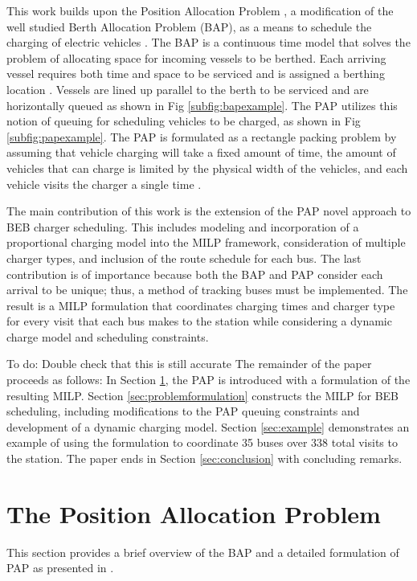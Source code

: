 \documentclass[utf8]{FrontiersinHarvard}
\let\cite\citep                                                                 %
\newcommand{\TODO}[1]{{\color{green} To do: #1}}                                %
\newcommand{\A}{35 }                                                            %
\newcommand{\N}{338 }                                                           %
\begin{document}
This work builds upon the Position Allocation Problem \cite{Qarebagh2019}, a modification of the well studied Berth
Allocation Problem (BAP), as a means to schedule the charging of electric vehicles \cite{Buhrkal2010, Frojan2015,
  Imai2001}. The BAP is a continuous time model that solves the problem of allocating space for incoming vessels to be
berthed. Each arriving vessel requires both time and space to be serviced and is assigned a berthing location
\cite{Imai2001}. Vessels are lined up parallel to the berth to be serviced and are horizontally queued as shown in Fig
\ref{subfig:bapexample}. The PAP utilizes this notion of queuing for scheduling vehicles to be charged, as shown in Fig
\ref{subfig:papexample}. The PAP is formulated as a rectangle packing problem by assuming that vehicle charging will
take a fixed amount of time, the amount of vehicles that can charge is limited by the physical width of the vehicles,
and each vehicle visits the charger a single time \cite{Qarebagh2019}.

The main contribution of this work is the extension of the PAP novel approach to BEB charger scheduling. This includes
modeling and incorporation of a proportional charging model into the MILP framework, consideration of multiple charger
types, and inclusion of the route schedule for each bus. The last contribution is of importance because both the BAP and
PAP consider each arrival to be unique; thus, a method of tracking buses must be implemented. The result is a MILP
formulation that coordinates charging times and charger type for every visit that each bus makes to the station while
considering a dynamic charge model and scheduling constraints.

\TODO{Double check that this is still accurate}
The remainder of the paper proceeds as follows: In Section \ref{sec:positionallocationproblem}, the PAP is introduced
with a formulation of the resulting MILP. Section \ref{sec:problemformulation} constructs the MILP for BEB scheduling,
including modifications to the PAP queuing constraints and development of a dynamic charging model. Section
\ref{sec:example} demonstrates an example of using the formulation to coordinate \A buses over \N total visits to the
station. The paper ends in Section \ref{sec:conclusion} with concluding remarks.

\section{The Position Allocation Problem}
\label{sec:positionallocationproblem}
This section provides a brief overview of the BAP and a detailed formulation of PAP as presented in \cite{Qarebagh2019}.
\end{document}
